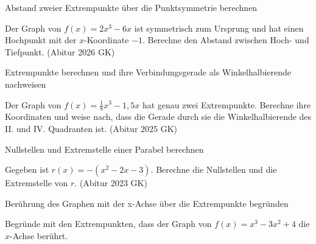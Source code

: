 \begin{aufgabe}{Abstand zweier Extrempunkte über die Punktsymmetrie berechnen}
\begin{teile}
\teil Der Graph von $f(x) = 2x^3 - 6x$ ist symmetrisch zum Ursprung und hat einen Hochpunkt mit der $x$-Koordinate $-1$. Berechne den Abstand zwischen Hoch- und Tiefpunkt. \hfill (Abitur 2026 GK)
\end{teile}
\end{aufgabe}

\begin{aufgabe}{Extrempunkte berechnen und ihre Verbindungsgerade als Winkelhalbierende nachweisen}
\begin{teile}
\teil Der Graph von $f(x) = \frac{1}{8}x^3 - 1{,}5x$ hat genau zwei Extrempunkte. Berechne ihre Koordinaten und weise nach, dass die Gerade durch sie die Winkelhalbierende des II. und IV. Quadranten ist. \hfill (Abitur 2025 GK)
\end{teile}
\end{aufgabe}

\begin{aufgabe}{Nullstellen und Extremstelle einer Parabel berechnen}
\begin{teile}
\teil Gegeben ist $r(x) = -(x^2 - 2x - 3)$. Berechne die Nullstellen und die Extremstelle von $r$. \hfill (Abitur 2023 GK)
\end{teile}
\end{aufgabe}

\begin{aufgabe}{Berührung des Graphen mit der x-Achse über die Extrempunkte begründen}
\begin{teile}
\teil Begründe mit den Extrempunkten, dass der Graph von $f(x) = x^3 - 3x^2 + 4$ die $x$-Achse berührt.
\end{teile}
\end{aufgabe}

